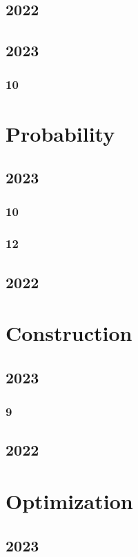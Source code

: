 \documentclass[11pt]{book}
\begin{document}
\section{2022}

\section{2023}
\subsection{10}
%
\chapter{Probability}
\section{2023}
\subsection{10}

\subsection{12}

\section{2022}

\chapter{Construction}
\section{2023}
\subsection{9}

\section{2022}

\chapter{Optimization}
\section{2023}

%
\end{document}
